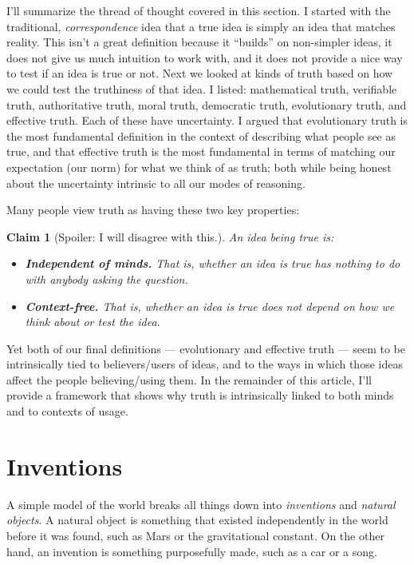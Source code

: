 \documentclass[11pt, oneside]{article}   	%
\newtheorem{claim}{Claim}
\begin{document}
I'll summarize the thread of thought covered in this section.
I started with the traditional, {\em correspondence} idea that a true idea is
simply an idea that matches reality. 
This isn't a great definition because it ``builds'' on non-simpler ideas, it
does not give us much intuition to work with, and it does not provide a nice way
to test if an idea is true or not.
Next we looked at kinds of truth based on how we could test the truthiness of
that idea. I listed: mathematical truth, verifiable truth, authoritative truth,
moral truth, democratic truth, evolutionary truth, and effective truth. Each of
these have uncertainty. I argued that evolutionary truth is the most fundamental
definition in the context of describing what people see as true, and that
effective truth is the most fundamental in terms of matching our expectation
(our norm) for what we think of as truth; both while being honest about the
uncertainty intrinsic to all our modes of reasoning.

Many people view truth as having these two key properties:
\begin{claim}[Spoiler: I will disagree with this.]\label{c7}
    An idea being true is:
\begin{itemize}
    \item {\bf Independent of minds.} That is, whether an idea is true has
        nothing to
        do with anybody asking the question.
    \item {\bf Context-free.} That is, whether an idea is true does not depend
        on
        how we think about or test the idea.
\end{itemize}
\end{claim}
Yet both of our final definitions --- evolutionary and effective truth --- seem
to be intrinsically tied to believers/users of ideas, and to the ways in which
those ideas affect the people believing/using them. In the remainder of this
article, I'll provide a framework that shows why truth is intrinsically linked
to both minds and to contexts of usage.

\section{Inventions}

A simple model of the world breaks all things down into {\em inventions} and
{\em natural objects}.
A natural object is something that existed independently in the
world before it was found, such as Mars or the gravitational constant.
On the other hand, an
invention is something purposefully made, such as
a car or a song.
\end{document}
